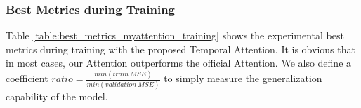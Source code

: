 \documentclass[
twocolumn,
]{ceurart}
\begin{document}
\subsubsection{Best Metrics during Training}



Table \ref{table:best_metrics_myattention_training} shows the experimental best metrics during training with the proposed Temporal Attention. It is obvious that in most cases, our Attention outperforms the official Attention. We also define a coefficient $ratio=\frac{min(train\ MSE)}{min(validation\ MSE)}$ to simply measure the generalization capability of the model.
\end{document}
